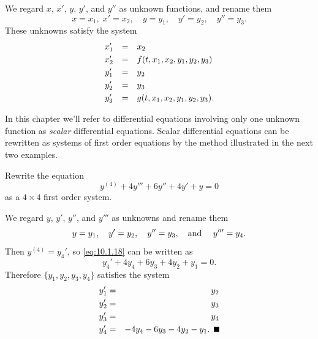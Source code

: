 \begin{examplesolution}
\solution We regard $x$, $x'$, $y$, $y'$, and $y''$ as unknown functions, and rename them
\[
  x=x_{1},\;x'=x_{2},\quad y=y_{1},\quad y'=y_{2},\quad y''=y_{3}.
\]
These unknowns satisfy the system
\[
  \begin{array}{ccl}
    x_{1}' & = & x_{2}                               \\[1\jot]
    x_{2}' & = & f(t,x_{1},x_{2},y_{1},y_{2},y_{3})  \\[1\jot]
    y_{1}' & = & y_{2}                               \\[1\jot]
    y_{2}' & = & y_{3}                               \\[1\jot]
    y_{3}' & = & g(t,x_{1},x_{2},y_{1},y_{2},y_{3}).
  \end{array}
\]
\end{examplesolution}


\noindent
In this chapter we'll refer to differential equations involving only one unknown function as
{\color{blue}\it scalar\/} differential equations. Scalar differential equations can be rewritten as
systems of first order equations by the method illustrated in the next two examples.

\begin{example}
  \label{example:10.1.6} \rm Rewrite the equation
  \begin{equation}
    \label{eq:10.1.18}y^{(4)}+4y'''+6y''+4y'+y=0
  \end{equation}
  as a $4\times4$ first order system.
\end{example}

\begin{examplesolution}
\solution We regard $y$, $y'$, $y''$, and $y'''$ as unknowns and rename them
\[
  y=y_{1},\quad y'=y_{2},\quad y''=y_{3},\mbox{\quad and \quad}y'''=y_{4}.
\]
Then $y^{(4)}=y_{4}'$, so \eqref{eq:10.1.18} can be written as
\[
  y_{4}'+4y_{4}+6y_{3}+4y_{2}+y_{1}=0.
\]
Therefore $\{y_{1},y_{2},y_{3},y_{4}\}$ satisfies the system
\begin{eqnarray*}
  y_{1}' & = & y_{2} \\
  y_{2}' & = & y_{3} \\
  y_{3}' & = & y_{4} \\
  y_{4}' & = & -4y_{4}-6y_{3}-4y_{2}-y_{1}.\bbox
\end{eqnarray*}
\end{examplesolution}

